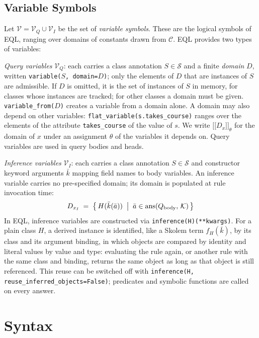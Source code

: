 \documentclass[11pt, a4paper]{article}
\newcommand{\llbracket}{\mathopen{[\![}}
\newcommand{\rrbracket}{\mathclose{]\!]}}
\theoremstyle{plain}
\theoremstyle{definition}
\theoremstyle{remark}
\begin{document}
\subsection{Variable Symbols}
\label{sec:eql:vars}

Let $\mathcal{V} = \mathcal{V}_Q \cup \mathcal{V}_I$ be the set of \emph{variable symbols}. These are the logical symbols of EQL, ranging over domains of constants drawn from $\mathcal{C}$.
EQL provides two types of variables:

\emph{Query variables} $\mathcal{V}_Q$: each carries a class annotation $S \in \mathcal{S}$ and a
finite \emph{domain} $D$, written \texttt{variable($S$, domain=$D$)}; only the elements of $D$
that are instances of $S$ are admissible.  If $D$ is omitted, it is the set of instances of $S$
in memory, for classes whose instances are tracked; for other classes a domain must be given.
\texttt{variable\_from($D$)} creates a variable from a domain alone.  A domain may also depend on
other variables: \texttt{flat\_variable(s.takes\_course)} ranges over the elements of the
attribute \texttt{takes\_course} of the value of $s$.  We write $\llbracket D_x \rrbracket_\theta$
for the domain of $x$ under an assignment $\theta$ of the variables it depends on.
Query variables are used in query bodies and heads.

\emph{Inference variables} $\mathcal{V}_I$: each carries a class annotation $S \in
\mathcal{S}$ and
constructor keyword arguments $\bar{k}$ mapping field names to body variables.  An inference
variable carries no pre-specified domain; its domain is populated at rule invocation time:
\[
  D_{x_I} \;=\;
  \bigl\{\, H(\bar{k}(\bar{a})) \;\bigm|\; \bar{a} \in \mathrm{ans}(Q_{\mathrm{body}},\,\mathcal{K}) \,\bigr\}
\]
In EQL, inference variables are constructed via \texttt{inference(H)(**kwargs)}.  For a plain
class $H$, a derived instance is identified, like a Skolem term $f_H(\bar{k})$, by its class and
its argument binding, in which objects are compared by identity and literal values by value and
type: evaluating the rule again, or another rule with the same class and binding, returns the
same object as long as that object is still referenced.  This reuse can be switched off with
\texttt{inference(H, reuse\_inferred\_objects=False)}; predicates and symbolic functions are
called on every answer.

\section{Syntax}
\label{sec:eql:syntax}
\end{document}
